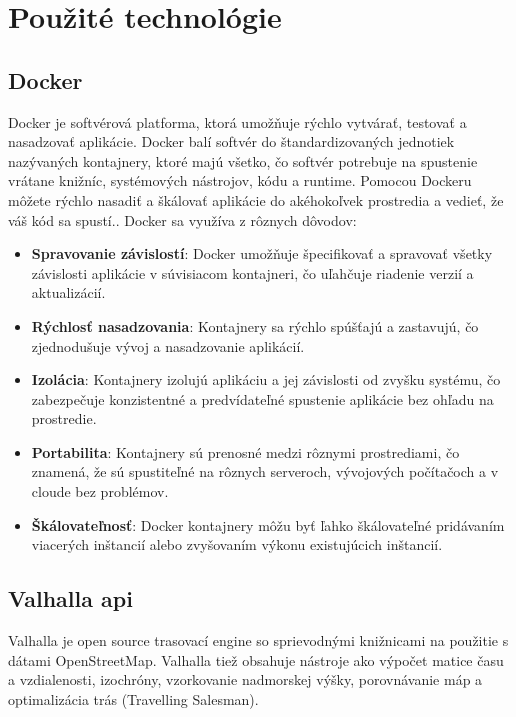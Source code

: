 \section{Použité technológie}
\subsection{Docker}

\indent \indent Docker je softvérová platforma, ktorá umožňuje rýchlo vytvárať, testovať a nasadzovať aplikácie. Docker balí softvér do štandardizovaných jednotiek nazývaných kontajnery, ktoré majú všetko, čo softvér potrebuje na spustenie vrátane knižníc, systémových nástrojov, kódu a runtime. Pomocou Dockeru môžete rýchlo nasadiť a škálovať aplikácie do akéhokoľvek prostredia a vedieť, že váš kód sa spustí.\cite{docker}. Docker sa využíva z rôznych dôvodov\cite{whyDocker}: 
\begin{itemize}
    \item \textbf{Spravovanie závislostí}: Docker umožňuje špecifikovať a spravovať všetky závislosti aplikácie v súvisiacom kontajneri, čo uľahčuje riadenie verzií a aktualizácií.
    \item \textbf{Rýchlosť nasadzovania}: Kontajnery sa rýchlo spúšťajú a zastavujú, čo zjednodušuje vývoj a nasadzovanie aplikácií.
    \item \textbf{Izolácia}: Kontajnery izolujú aplikáciu a jej závislosti od zvyšku systému, čo zabezpečuje konzistentné a predvídateľné spustenie aplikácie bez ohľadu na prostredie.
    \item \textbf{Portabilita}: Kontajnery sú prenosné medzi rôznymi prostrediami, čo znamená, že sú spustiteľné na rôznych serveroch, vývojových počítačoch a v cloude bez problémov.
    \item \textbf{Škálovateľnosť}: Docker kontajnery môžu byť ľahko škálovateľné pridávaním viacerých inštancií alebo zvyšovaním výkonu existujúcich inštancií.
\end{itemize}
\subsection{Valhalla api \label{section:valhalla}}

\indent \indent Valhalla je open source trasovací engine so sprievodnými knižnicami na použitie s dátami OpenStreetMap. Valhalla tiež obsahuje nástroje ako výpočet matice času a vzdialenosti, izochróny, vzorkovanie nadmorskej výšky, porovnávanie máp a optimalizácia trás (Travelling Salesman)\cite{valhalla}.\\

